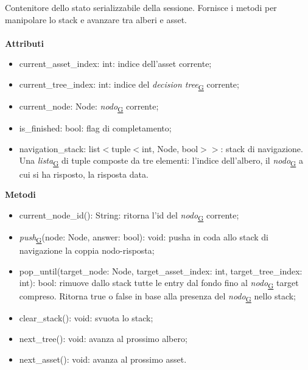 \documentclass[a4paper,12pt]{article}
\begin{document}
                    Contenitore dello stato serializzabile della sessione. Fornisce i metodi per manipolare lo stack e avanzare tra alberi e asset.\\\\
                    \textbf{Attributi}
                    \begin{itemize}
                        \item {\ttfamily current\_asset\_index: int}: indice dell'asset corrente;
                        \item {\ttfamily current\_tree\_index: int}: indice del \textit{decision tree}\textsubscript{\href{https://atlasteam9.github.io/Atlas/glossario.html\#DecisionTree}{G}} corrente;
                        \item {\ttfamily current\_node: Node}: \textit{nodo}\textsubscript{\href{https://atlasteam9.github.io/Atlas/glossario.html\#Nodo}{G}} corrente;
                        \item {\ttfamily is\_finished: bool}: flag di completamento;
                        \item {\ttfamily navigation\_stack: list$<$tuple$<$int, Node, bool$>>$}: stack di navigazione. Una \textit{lista}\textsubscript{\href{https://atlasteam9.github.io/Atlas/glossario.html\#Lista}{G}} di tuple composte da tre elementi: l'indice dell'albero, il \textit{nodo}\textsubscript{\href{https://atlasteam9.github.io/Atlas/glossario.html\#Nodo}{G}} a cui si ha risposto, la risposta data. 
                    \end{itemize}
                    \textbf{Metodi}
                    \begin{itemize}
                        \item {\ttfamily current\_node\_id(): String}: ritorna l'id del \textit{nodo}\textsubscript{\href{https://atlasteam9.github.io/Atlas/glossario.html\#Nodo}{G}} corrente;
                        \item {\ttfamily \textit{push}\textsubscript{\href{https://atlasteam9.github.io/Atlas/glossario.html\#Push}{G}}(node: Node, answer: bool): void}: pusha in coda allo stack di navigazione la coppia nodo-risposta;
                        \item {\ttfamily pop\_until(target\_node: Node, target\_asset\_index: int, target\_tree\_index: int): bool}: rimuove dallo stack tutte le entry dal fondo fino al \textit{nodo}\textsubscript{\href{https://atlasteam9.github.io/Atlas/glossario.html\#Nodo}{G}} target compreso. Ritorna true o false in base alla presenza del \textit{nodo}\textsubscript{\href{https://atlasteam9.github.io/Atlas/glossario.html\#Nodo}{G}} nello stack;
                        \item {\ttfamily clear\_stack(): void}: svuota lo stack;
                        \item {\ttfamily next\_tree(): void}: avanza al prossimo albero;
                        \item {\ttfamily next\_asset(): void}: avanza al prossimo asset.
                    \end{itemize}
\end{document}
